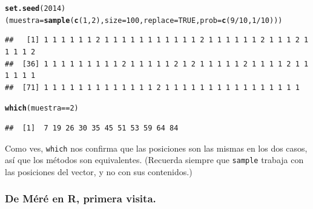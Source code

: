 \documentclass[10pt,a4paper]{article}\usepackage[]{graphicx}\usepackage[]{color}
\makeatletter
\newcommand{\hlnum}[1]{\textcolor[rgb]{0.686,0.059,0.569}{#1}}%
\newcommand{\hlopt}[1]{\textcolor[rgb]{0,0,0}{#1}}%
\newcommand{\hlstd}[1]{\textcolor[rgb]{0.345,0.345,0.345}{#1}}%
\newcommand{\hlkwb}[1]{\textcolor[rgb]{0.69,0.353,0.396}{#1}}%
\newcommand{\hlkwc}[1]{\textcolor[rgb]{0.333,0.667,0.333}{#1}}%
\newcommand{\hlkwd}[1]{\textcolor[rgb]{0.737,0.353,0.396}{\textbf{#1}}}%
\newenvironment{kframe}{%
 \def\at@end@of@kframe{}%
 \ifinner\ifhmode%
  \def\at@end@of@kframe{\end{minipage}}%
  \begin{minipage}{\columnwidth}%
 \fi\fi%
 \def\FrameCommand##1{\hskip\@totalleftmargin \hskip-\fboxsep
 \colorbox{shadecolor}{##1}\hskip-\fboxsep
     \hskip-\linewidth \hskip-\@totalleftmargin \hskip\columnwidth}%
 \MakeFramed {\advance\hsize-\width
   \@totalleftmargin\z@ \linewidth\hsize
   \@setminipage}}%
 {\par\unskip\endMakeFramed%
 \at@end@of@kframe}
\newenvironment{knitrout}{}{} %
\newcounter {cont01}
\makeatother
\begin{document}
\begin{knitrout}
\color{fgcolor}\begin{kframe}
\begin{alltt}
\hlkwd{set.seed}\hlstd{(}\hlnum{2014}\hlstd{)}
\hlstd{(muestra} \hlkwb{=} \hlkwd{sample}\hlstd{(}\hlkwd{c}\hlstd{(}\hlnum{1}\hlstd{,}\hlnum{2}\hlstd{),} \hlkwc{size}\hlstd{=}\hlnum{100}\hlstd{,} \hlkwc{replace}\hlstd{=}\hlnum{TRUE}\hlstd{,} \hlkwc{prob}\hlstd{=}\hlkwd{c}\hlstd{(}\hlnum{9}\hlopt{/}\hlnum{10}\hlstd{,} \hlnum{1}\hlopt{/}\hlnum{10}\hlstd{) ) )}
\end{alltt}
\begin{verbatim}
##   [1] 1 1 1 1 1 1 2 1 1 1 1 1 1 1 1 1 1 1 2 1 1 1 1 1 1 2 1 1 1 2 1 1 1 1 2
##  [36] 1 1 1 1 1 1 1 1 1 2 1 1 1 1 1 2 1 2 1 1 1 1 1 2 1 1 1 1 2 1 1 1 1 1 1
##  [71] 1 1 1 1 1 1 1 1 1 1 1 1 1 2 1 1 1 1 1 1 1 1 1 1 1 1 1 1 1 1
\end{verbatim}
\begin{alltt}
\hlkwd{which}\hlstd{(muestra}\hlopt{==}\hlnum{2}\hlstd{)}
\end{alltt}
\begin{verbatim}
##  [1]  7 19 26 30 35 45 51 53 59 64 84
\end{verbatim}
\end{kframe}
\end{knitrout}
     Como ves, {\tt which} nos confirma que las posiciones son las mismas en los dos casos, así que los métodos son equivalentes. (Recuerda siempre que {\tt sample} trabaja con las posiciones del vector, y no con sus contenidos.)

\subsubsection{De Méré en R, primera visita.}
\label{tut03:subsubsec:DeMereRPrimeraVisita}
\end{document}
